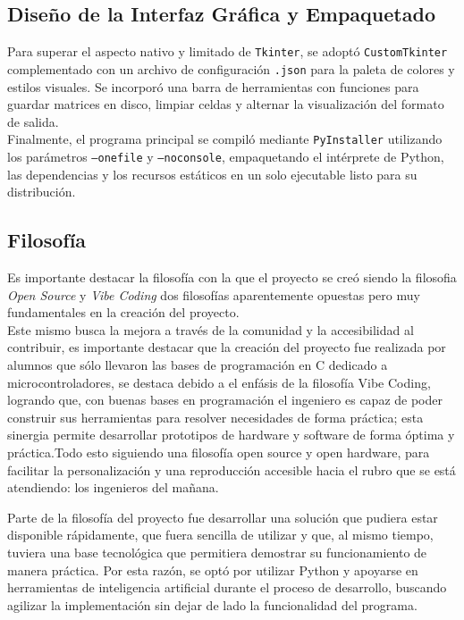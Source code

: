\documentclass[12pt,a4paper]{article}
\begin{document}
\subsection{Diseño de la Interfaz Gráfica y Empaquetado}
Para superar el aspecto nativo y limitado de \texttt{Tkinter}, se adoptó \texttt{CustomTkinter} complementado con un archivo de configuración \texttt{.json} para la paleta de colores y estilos visuales. Se incorporó una barra de herramientas con funciones para guardar matrices en disco, limpiar celdas y alternar la visualización del formato de salida. \\

Finalmente, el programa principal se compiló mediante \texttt{PyInstaller} utilizando los parámetros \texttt{--onefile} y \texttt{--noconsole}, empaquetando el intérprete de Python, las dependencias y los recursos estáticos en un solo ejecutable listo para su distribución.

\subsection{Filosofía}
Es importante destacar la filosofía con la que el proyecto se creó siendo la filosofia \textit{Open Source} y \textit{Vibe Coding} dos filosofías aparentemente opuestas pero muy fundamentales en la creación del proyecto. \\


Este mismo busca la mejora a través de la comunidad y la accesibilidad al contribuir, es importante destacar que la creación
del proyecto fue realizada por alumnos que sólo llevaron las bases de programación en C dedicado a microcontroladores, se destaca debido a el enfásis de la filosofía Vibe Coding, logrando que, con buenas bases en programación el ingeniero es capaz de poder construir sus herramientas para resolver necesidades de forma práctica; esta sinergia permite desarrollar prototipos de hardware y software de forma óptima y práctica.Todo esto siguiendo una filosofía open source y open hardware, para facilitar la personalización y una reproducción accesible hacia el rubro que se está atendiendo: los ingenieros del mañana.  \\

\newpage

Parte de la filosofía del proyecto fue desarrollar una solución que pudiera estar disponible rápidamente, que fuera sencilla de utilizar y que, al mismo tiempo, tuviera una base tecnológica que permitiera demostrar su funcionamiento de manera práctica. Por esta razón, se optó por utilizar Python y apoyarse en herramientas de inteligencia artificial durante el proceso de desarrollo, buscando agilizar la implementación sin dejar de lado la funcionalidad del programa. \\
\end{document}
